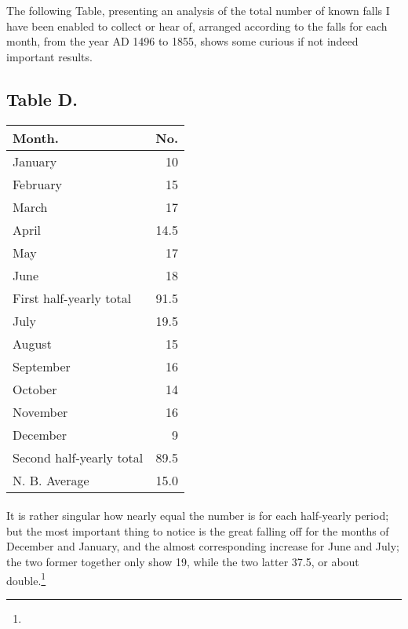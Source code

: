 \documentclass[a4paper, 12pt, oneside]{article}
\begin{document}
The following Table, presenting an analysis of the total number of known falls I have been enabled to collect or hear of, arranged according to the falls for each month, from the year AD 1496 to 1855, shows some curious if not indeed important results.
\subsection{Table D.}
 \begin{table}[H]
    \centering
    \Fontauri
    \begin{tabular}{|l|r|}
    \hline
        Month. & No. \\ \hline
        January & 10 \\
        February & 15 \\
        March & 17 \\
        April & 14.5 \\
        May & 17 \\
        June & 18 \\ \hline
        First half-yearly total & 91.5 \\ \hline
        July & 19.5 \\
        August & 15 \\
        September & 16 \\
        October & 14 \\
        November & 16 \\
        December & 9 \\ \hline
        Second half-yearly total & 89.5 \\ \hline \hline
        N. B. Average & 15.0 \\ \hline
    \end{tabular}
\end{table}
\paragraph{}
It is rather singular how nearly equal the number is for each half-yearly period; but the most important thing to notice is the great falling off for the months of December and January, and the almost corresponding increase for June and July; the two former together only show 19, while the two latter 37.5, or about double.\footnote{}
\end{document}
